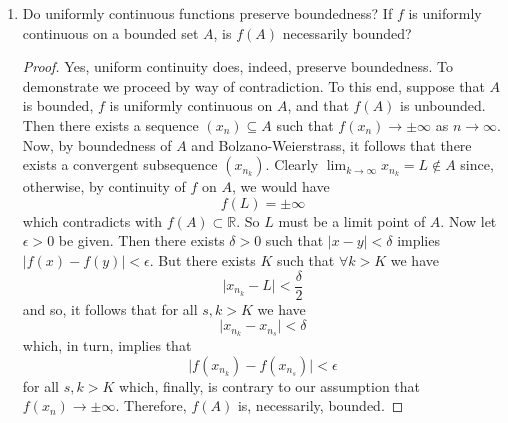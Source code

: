 \begin{enumerate}
\begin{proof}
\begin{enumerate}
        \item No the converse is not true. Take \( f(x) = \sqrt{x} \). As we have shown, \( f \) is uniformly continuous on \( [0,\infty) \). However, we observe that, given \( M > 0 \), for all \( 0 < x < \frac{1}{M^{2}} \) we have
        \[
        \left| \frac{\sqrt{x}-\sqrt{0}}{x-0} \right| = \frac{\sqrt{x}}{x} = \frac{1}{\sqrt{x}} > \frac{1}{\sqrt{\frac{1}{M^{2}}}} = M
        \]
    \end{enumerate}
    \end{proof}    
    
    \item Do uniformly continuous functions preserve boundedness? If \( f \) is uniformly continuous on a bounded set \( A \), is \( f(A) \) necessarily bounded?
    
    \begin{proof}
        Yes, uniform continuity does, indeed, preserve boundedness. To demonstrate we proceed by way of contradiction. To this end, suppose that \( A \) is bounded, \( f \) is uniformly continuous on \( A \), and that \( f(A) \) is unbounded. Then there exists a sequence \( (x_{n}) \subseteq A \) such that \linebreak \( f(x_{n}) \rightarrow \pm \infty \) as \( n \rightarrow \infty \). Now, by boundedness of \( A \) and Bolzano-Weierstrass, it follows that there exists a convergent subsequence \( (x_{n_{k}}) \). Clearly \( \lim_{k\rightarrow \infty} x_{n_{k}} = L \not\in A \) since, otherwise, by continuity of \( f \) on \( A \), we would have
        \[
        f(L) = \pm \infty 
        \]
        which contradicts with \( f(A) \subset \mathbb{R} \). So \( L \) must be a limit point of \( A \). Now let \( \epsilon > 0 \) be given. Then there exists \( \delta > 0 \) such that \( \vert x - y \vert < \delta \) implies \( \vert f(x) - f(y) \vert < \epsilon \). But there exists \( K \) such that \( \forall k > K \) we have
        \[
        \vert x_{n_{k}} - L \vert < \frac{\delta}{2}
        \]
        and so, it follows that for all \( s,k > K \) we have
        \[
        \vert x_{n_{k}} - x_{n_{s}} \vert < \delta
        \]
        which, in turn, implies that
        \[
        \vert f(x_{n_{k}}) - f(x_{n_{s}}) \vert < \epsilon
        \]
        for all \( s,k > K \) which, finally, is contrary to our assumption that \linebreak \( f(x_{n}) \rightarrow \pm \infty \). Therefore, \( f(A) \) is, necessarily, bounded.
    \end{proof}
    

\end{enumerate}
